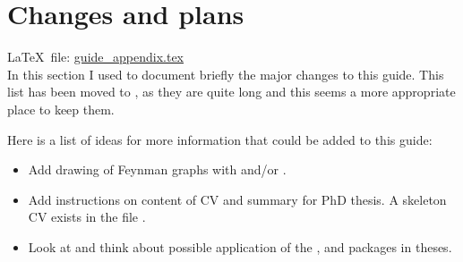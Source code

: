 
\chapter{Changes and plans}%
\label{sec:app:changes}

\LaTeX\ file: \href{run:./guide_appendix.tex}{guide\_appendix.tex}\\[1ex]
\noindent
In this section I used to document briefly the major changes to this guide.
This list has been moved to ,
as they are quite long and this seems a more appropriate place to keep them.

Here is a list of ideas for more information that could be added to
this guide:
\begin{itemize}
\item Add drawing of Feynman graphs with  and/or
  .
\item Add instructions on content of CV and summary for PhD thesis.
  A skeleton CV exists in the file .
\item Look at and think about possible application of the
  ,  and  packages
  in theses.
\end{itemize}























